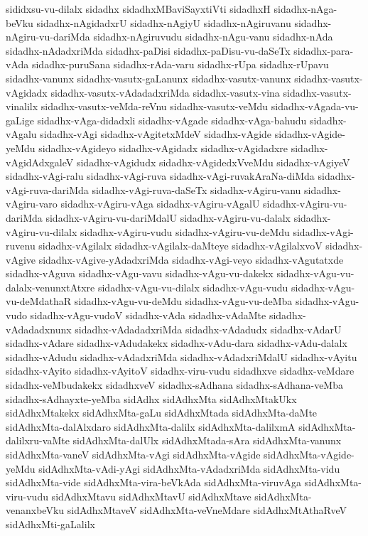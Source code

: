 {sididxsu-vu-dilalx
sidadhx
sidadhxMBaviSayxtiVti
sidadhxH
sidadhx-nAga-beVku
sidadhx-nAgidadxrU
sidadhx-nAgiyU
sidadhx-nAgiruvanu
sidadhx-nAgiru-vu-dariMda
sidadhx-nAgiruvudu
sidadhx-nAgu-vanu
sidadhx-nAda
sidadhx-nAdadxriMda
sidadhx-paDisi
sidadhx-paDisu-vu-daSeTx
sidadhx-para-vAda
sidadhx-puruSana
sidadhx-rAda-varu
sidadhx-rUpa
sidadhx-rUpavu
sidadhx-vanunx
sidadhx-vasutx-gaLanunx
sidadhx-vasutx-vanunx
sidadhx-vasutx-vAgidadx
sidadhx-vasutx-vAdadadxriMda
sidadhx-vasutx-vina
sidadhx-vasutx-vinalilx
sidadhx-vasutx-veMda-reVnu
sidadhx-vasutx-veMdu
sidadhx-vAgada-vu-gaLige
sidadhx-vAga-didadxli
sidadhx-vAgade
sidadhx-vAga-bahudu
sidadhx-vAgalu
sidadhx-vAgi
sidadhx-vAgitetxMdeV
sidadhx-vAgide
sidadhx-vAgide-yeMdu
sidadhx-vAgideyo
sidadhx-vAgidadx
sidadhx-vAgidadxre
sidadhx-vAgidAdxgaleV
sidadhx-vAgidudx
sidadhx-vAgidedxVveMdu
sidadhx-vAgiyeV
sidadhx-vAgi-ralu
sidadhx-vAgi-ruva
sidadhx-vAgi-ruvakAraNa-diMda
sidadhx-vAgi-ruva-dariMda
sidadhx-vAgi-ruva-daSeTx
sidadhx-vAgiru-vanu
sidadhx-vAgiru-varo
sidadhx-vAgiru-vAga
sidadhx-vAgiru-vAgalU
sidadhx-vAgiru-vu-dariMda
sidadhx-vAgiru-vu-dariMdalU
sidadhx-vAgiru-vu-dalalx
sidadhx-vAgiru-vu-dilalx
sidadhx-vAgiru-vudu
sidadhx-vAgiru-vu-deMdu
sidadhx-vAgi-ruvenu
sidadhx-vAgilalx
sidadhx-vAgilalx-daMteye
sidadhx-vAgilalxvoV
sidadhx-vAgive
sidadhx-vAgive-yAdadxriMda
sidadhx-vAgi-veyo
sidadhx-vAgutatxde
sidadhx-vAguva
sidadhx-vAgu-vavu
sidadhx-vAgu-vu-dakekx
sidadhx-vAgu-vu-dalalx-venunxtAtxre
sidadhx-vAgu-vu-dilalx
sidadhx-vAgu-vudu
sidadhx-vAgu-vu-deMdathaR
sidadhx-vAgu-vu-deMdu
sidadhx-vAgu-vu-deMba
sidadhx-vAgu-vudo
sidadhx-vAgu-vudoV
sidadhx-vAda
sidadhx-vAdaMte
sidadhx-vAdadadxnunx
sidadhx-vAdadadxriMda
sidadhx-vAdadudx
sidadhx-vAdarU
sidadhx-vAdare
sidadhx-vAdudakekx
sidadhx-vAdu-dara
sidadhx-vAdu-dalalx
sidadhx-vAdudu
sidadhx-vAdadxriMda
sidadhx-vAdadxriMdalU
sidadhx-vAyitu
sidadhx-vAyito
sidadhx-vAyitoV
sidadhx-viru-vudu
sidadhxve
sidadhx-veMdare
sidadhx-veMbudakekx
sidadhxveV
sidadhx-sAdhana
sidadhx-sAdhana-veMba
sidadhx-sAdhayxte-yeMba
sidAdhx
sidAdhxMta
sidAdhxMtakUkx
sidAdhxMtakekx
sidAdhxMta-gaLu
sidAdhxMtada
sidAdhxMta-daMte
sidAdhxMta-dalAlxdaro
sidAdhxMta-dalilx
sidAdhxMta-dalilxmA
sidAdhxMta-dalilxru-vaMte
sidAdhxMta-dalUlx
sidAdhxMtada-sAra
sidAdhxMta-vanunx
sidAdhxMta-vaneV
sidAdhxMta-vAgi
sidAdhxMta-vAgide
sidAdhxMta-vAgide-yeMdu
sidAdhxMta-vAdi-yAgi
sidAdhxMta-vAdadxriMda
sidAdhxMta-vidu
sidAdhxMta-vide
sidAdhxMta-vira-beVkAda
sidAdhxMta-viruvAga
sidAdhxMta-viru-vudu
sidAdhxMtavu
sidAdhxMtavU
sidAdhxMtave
sidAdhxMta-venanxbeVku
sidAdhxMtaveV
sidAdhxMta-veVneMdare
sidAdhxMtAthaRveV
sidAdhxMti-gaLalilx
}
